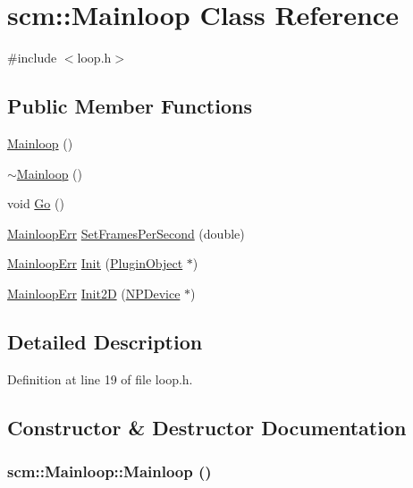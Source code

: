 \hypertarget{classscm_1_1_mainloop}{
\section{scm::Mainloop Class Reference}
\label{classscm_1_1_mainloop}
}


{\ttfamily \#include $<$loop.h$>$}

\subsection*{Public Member Functions}
\begin{DoxyCompactItemize}
\item 
\hyperlink{classscm_1_1_mainloop_abacbb3c174abded439ddf745e840dd29}{Mainloop} ()
\item 
\hyperlink{classscm_1_1_mainloop_a0638591ae4a2df7e99d2ba586ad5edfe}{$\sim$Mainloop} ()
\item 
void \hyperlink{classscm_1_1_mainloop_a7e332605f463847553999278a975d650}{Go} ()
\item 
\hyperlink{namespacescm_aec9fbdb87d677e6e822d612ed3e3a20b}{MainloopErr} \hyperlink{classscm_1_1_mainloop_a47a4747a4529b29b2337942496bc4e61}{SetFramesPerSecond} (double)
\item 
\hyperlink{namespacescm_aec9fbdb87d677e6e822d612ed3e3a20b}{MainloopErr} \hyperlink{classscm_1_1_mainloop_a3b4177ac538fb42bc7bed6bb5e84a6dc}{Init} (\hyperlink{class_plugin_object}{PluginObject} $\ast$)
\item 
\hyperlink{namespacescm_aec9fbdb87d677e6e822d612ed3e3a20b}{MainloopErr} \hyperlink{classscm_1_1_mainloop_ab4e2e2a9df321c2761d24690a503cc06}{Init2D} (\hyperlink{struct_n_p_device}{NPDevice} $\ast$)
\end{DoxyCompactItemize}


\subsection{Detailed Description}


Definition at line 19 of file loop.h.



\subsection{Constructor \& Destructor Documentation}
\hypertarget{classscm_1_1_mainloop_abacbb3c174abded439ddf745e840dd29}{
\subsubsection[{Mainloop}]{\setlength{\rightskip}{0pt plus 5cm}scm::Mainloop::Mainloop ()}}
\label{classscm_1_1_mainloop_abacbb3c174abded439ddf745e840dd29}


